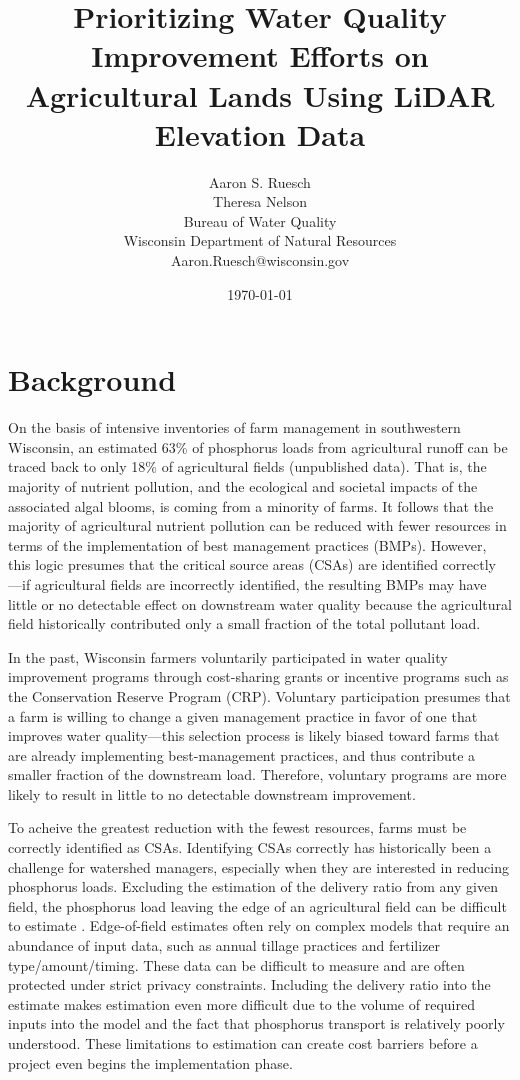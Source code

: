 \documentclass[12pt]{article}
\title{Prioritizing Water Quality Improvement Efforts on Agricultural Lands Using LiDAR Elevation Data}
\author{
	Aaron S. Ruesch\\
	Theresa Nelson\\
	Bureau of Water Quality\\
	Wisconsin Department of Natural Resources\\
	Aaron.Ruesch@wisconsin.gov
}
\date{\today}
\begin{document}
\maketitle
\section{Background}
On the basis of intensive inventories of farm management in southwestern Wisconsin, an estimated 63\% of phosphorus loads from agricultural runoff can be traced back to only 18\% of agricultural fields (unpublished data). That is, the majority of nutrient pollution, and the ecological and societal impacts of the associated algal blooms, is coming from a minority of farms. It follows that the majority of agricultural nutrient pollution can be reduced with fewer resources in terms of the implementation of best management practices (BMPs). However, this logic presumes that the critical source areas (CSAs) are identified correctly \cite{weld_identifying_2001}---if agricultural fields are incorrectly identified, the resulting BMPs may have little or no detectable effect on downstream water quality because the agricultural field historically contributed only a small fraction of the total pollutant load.

In the past, Wisconsin farmers voluntarily participated in water quality improvement programs \cite{wisconsin_department_of_natural_resources_wisconsins_2011} through cost-sharing grants or incentive programs such as the Conservation Reserve Program (CRP). Voluntary participation presumes that a farm is willing to change a given management practice in favor of one that improves water quality---this selection process is likely biased toward farms that are already implementing best-management practices, and thus contribute a smaller fraction of the downstream load. Therefore, voluntary programs are more likely to result in little to no detectable downstream improvement.

To acheive the greatest reduction with the fewest resources, farms must be correctly identified as CSAs. Identifying CSAs correctly has historically been a challenge for watershed managers, especially when they are interested in reducing phosphorus loads. Excluding the estimation of the delivery ratio from any given field, the phosphorus load leaving the edge of an agricultural field can be difficult to estimate \cite{nelson_evaluation_2012}. Edge-of-field estimates often rely on complex models that require an abundance of input data, such as annual tillage practices and fertilizer type/amount/timing. These data can be difficult to measure and are often protected under strict privacy constraints. Including the delivery ratio into the estimate makes estimation even more difficult due to the volume of required inputs into the model and the fact that phosphorus transport is relatively poorly understood. These limitations to estimation can create cost barriers before a project even begins the implementation phase.
\end{document}
